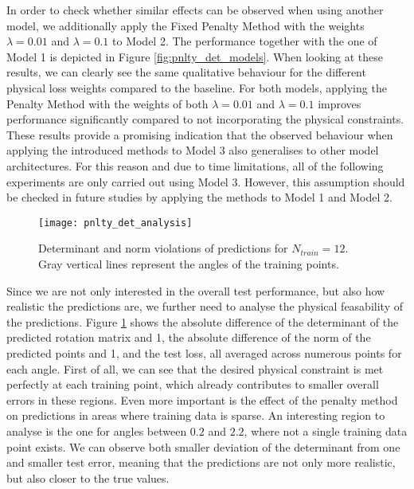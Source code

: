 In order to check whether similar effects can be observed when using another model, we additionally apply the Fixed Penalty Method with the weights $\lambda = 0.01$ and $\lambda = 0.1$ to Model 2. The performance together with the one of Model 1 is depicted in Figure \ref{fig:pnlty_det_models}. When looking at these results, we can clearly see the same qualitative behaviour for the different physical loss weights compared to the baseline. For both models, applying the Penalty Method with the weights of both $\lambda = 0.01$ and $\lambda = 0.1$ improves performance significantly compared to not incorporating the physical constraints. These results provide a promising indication that the observed behaviour when applying the introduced methods to Model 3 also generalises to other model architectures. For this reason and due to time limitations, all of the following experiments are only carried out using Model 3. However, this assumption should be checked in future studies by applying the methods to Model 1 and Model 2.
\begin{figure}[H]
	\texttt{[image: pnlty\_det\_analysis]}
	\caption{Determinant and norm violations of predictions for $N_{train} = 12$. Gray vertical lines represent the angles of the training points.}
	\label{fig:pnlty_det_analysis}
\end{figure}
\indent Since we are not only interested in the overall test performance, but also how realistic the predictions are, we further need to analyse the physical feasability of the predictions. Figure \ref{fig:pnlty_det_analysis} shows the absolute difference of the determinant of the predicted rotation matrix and 1, the absolute difference of the norm of the predicted points and 1, and the test loss, all averaged across numerous points for each angle. First of all, we can see that the desired physical constraint is met perfectly at each training point, which already contributes to smaller overall errors in these regions. Even more important is the effect of the penalty method on predictions in areas where training data is sparse. An interesting region to analyse is the one for angles between $0.2$ and $2.2$, where not a single training data point exists. We can observe both smaller deviation of the determinant from one and smaller test error, meaning that the predictions are not only more realistic, but also closer to the true values.

